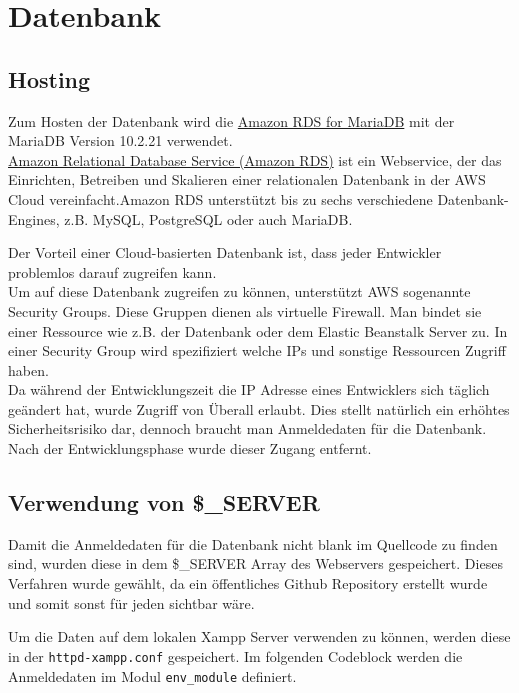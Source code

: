 \chapter{Datenbank}

\section{Hosting}
Zum Hosten der Datenbank wird die \href{https://aws.amazon.com/de/rds/mariadb/}{Amazon RDS for MariaDB} mit der MariaDB Version 10.2.21 verwendet. \\
\glqq\href{https://aws.amazon.com/de/rds/}{Amazon Relational Database Service (Amazon RDS)} ist ein Webservice, der das Einrichten, Betreiben und Skalieren einer relationalen Datenbank in der AWS Cloud vereinfacht.\grqq Amazon RDS unterstützt bis zu sechs verschiedene Datenbank-Engines, z.B. MySQL, PostgreSQL oder auch MariaDB. \cite{AWSRDS}

Der Vorteil einer Cloud-basierten Datenbank ist, dass jeder Entwickler problemlos darauf zugreifen kann.\\
Um auf diese Datenbank zugreifen zu können, unterstützt AWS sogenannte Security Groups. Diese Gruppen dienen als virtuelle Firewall. Man bindet sie einer Ressource wie z.B. der Datenbank oder dem Elastic Beanstalk Server zu. In einer Security Group wird spezifiziert welche IPs und sonstige Ressourcen Zugriff haben.\\
Da während der Entwicklungszeit die IP Adresse eines Entwicklers sich täglich geändert hat, wurde Zugriff von Überall erlaubt. Dies stellt natürlich ein erhöhtes Sicherheitsrisiko dar, dennoch braucht man Anmeldedaten für die Datenbank. Nach der Entwicklungsphase wurde dieser Zugang entfernt.

\section{Verwendung von \$\_SERVER}
Damit die Anmeldedaten für die Datenbank nicht blank im Quellcode zu finden sind, wurden diese in dem \$\_SERVER Array des Webservers gespeichert. Dieses Verfahren wurde gewählt, da ein öffentliches Github Repository erstellt wurde und somit sonst für jeden sichtbar wäre.

Um die Daten auf dem lokalen Xampp Server verwenden zu können, werden diese in der \lstinline{httpd-xampp.conf} gespeichert. Im folgenden Codeblock werden die Anmeldedaten im Modul \lstinline{env_module} definiert.

